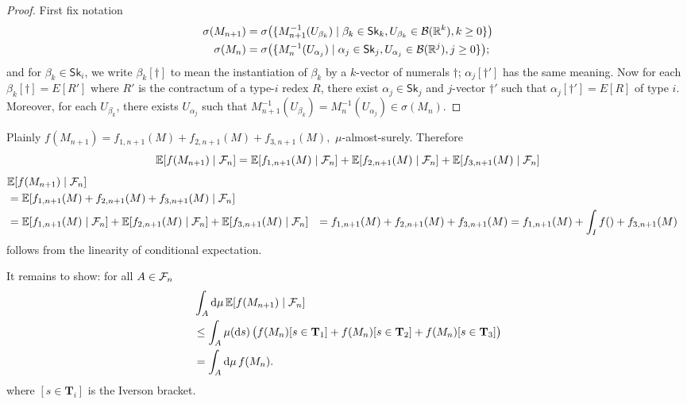 \begin{proof} First fix notation
\begin{align*}
\sigma(M_{n+1}) &= \sigma\big(\{M_{n+1}^{-1}(U_{\beta_k})
\mid \beta_k\in \mathsf{Sk}_k, U_{\beta_k} \in \mathcal{B}(\mathbb{R}^k), k \geq 0\}\big)\\
\sigma(M_{n}) &= \sigma\big(\{M_{n}^{-1}(U_{\alpha_j})
\mid \alpha_j\in \mathsf{Sk}_j, U_{\alpha_j} \in \mathcal{B}(\mathbb{R}^j), j \geq 0\}\big);
\end{align*}
and for $\beta_k \in \mathsf{Sk}_i$, we write $\beta_k[\dagger]$ to mean the instantiation of $\beta_k$ by a $k$-vector of numerals $\dagger$; $\alpha_j[\dagger']$ has the same meaning.
Now for each $\beta_k[\dagger] = E[R']$ where $R'$ is the contractum of a type-$i$ redex $R$, there exist $\alpha_j \in \mathsf{Sk}_j$ and $j$-vector $\dagger'$ such that $\alpha_j[\dagger'] = E[R]$ of type $i$.
Moreover, for each $U_{\beta_k}$, there exists $U_{\alpha_j}$ such that $M_{n+1}^{-1}(U_{\beta_k}) = M_{n}^{-1}(U_{\alpha_j}) \in \sigma(M_n)$.
\end{proof}

Plainly
\(
f(M_{n+1}) = %
f_{1, n+1}(M) + f_{2, n+1}(M) + f_{3, n+1}(M),
\)
$\mu$-almost-surely.
Therefore 
\[
\mathbb{E}[f(M_{n+1}) \mid \mathcal{F}_n] \nonumber \\
= 
\mathbb{E}[f_{1, n+1}(M) \mid \mathcal{F}_n] + \mathbb{E}[f_{2, n+1}(M) \mid \mathcal{F}_n] + \mathbb{E}[f_{3, n+1}(M) \mid \mathcal{F}_n] 
\]
\begin{align}
& \mathbb{E}[f(M_{n+1}) \mid \mathcal{F}_n] \nonumber \\
& = \mathbb{E}[f_{1, n+1}(M) + f_{2, n+1}(M) + f_{3, n+1}(M)  \mid \mathcal{F}_n] 
\nonumber \\
& = \mathbb{E}[f_{1, n+1}(M) \mid \mathcal{F}_n] + \mathbb{E}[f_{2, n+1}(M) \mid \mathcal{F}_n] + \mathbb{E}[f_{3, n+1}(M) \mid \mathcal{F}_n] 
\label{eqn:linear cond ex} 
& = f_{1, n+1}(M) + f_{2, n+1}(M) + f_{3, n+1}(M)
\label{eqn:inde cond exp}
& = f_{1, n+1}(M) + \int_I f() + f_{3, n+1}(M) \label{eqn:inde cond exp} \\
\end{align}
 follows from the linearity of conditional expectation. 

It remains to show: for all $A \in \mathcal{F}_n$
\begin{align}
& \int_A \mathrm{d} \mu \, \mathbb{E}[f(M_{n+1}) \mid \mathcal{F}_n] \nonumber \\
& \leq  \int_A \mu (\mathrm{d} s) \, \big(f(M_{n})[s \in \mathbf{T}_1] + f(M_{n})[s \in \mathbf{T}_2] + f(M_{n})[s \in \mathbf{T}_3]\big)
\label{eqn:ts} \\
& = \int_A \mathrm{d} \mu \, f(M_n). 
\label{eqn:partition} 
\end{align}
where $[s \in \mathbf{T}_i]$ is the Iverson bracket.

